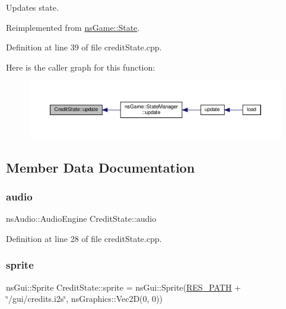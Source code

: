 Updates state. 



Reimplemented from \hyperlink{structns_game_1_1_state_ae809e89ac9df4a43ab90d5d5932e2bc7}{ns\+Game\+::\+State}.



Definition at line 39 of file credit\+State.\+cpp.

Here is the caller graph for this function\+:\nopagebreak
\begin{figure}[H]
\begin{center}
\leavevmode
\includegraphics[width=350pt]{class_credit_state_a52a92d650fce22fa08b37359c3a5aa64_icgraph}
\end{center}
\end{figure}


\subsection{Member Data Documentation}
\mbox{\label{class_credit_state_a8dd128ec1e8d3b8da0da5bd0be38c96d}} 
\subsubsection{\texorpdfstring{audio}{audio}}
{\footnotesize\ttfamily ns\+Audio\+::\+Audio\+Engine Credit\+State\+::audio}



Definition at line 28 of file credit\+State.\+cpp.

\mbox{\label{class_credit_state_a10ae436f8c1ca5d87cc960ada3cadb18}} 
\subsubsection{\texorpdfstring{sprite}{sprite}}
{\footnotesize\ttfamily ns\+Gui\+::\+Sprite Credit\+State\+::sprite = ns\+Gui\+::\+Sprite(\hyperlink{definitions_8h_a793644bd88146828177a2a4f57e3bf01}{R\+E\+S\+\_\+\+P\+A\+TH} + \char`\"{}/gui/credits.\+i2s\char`\"{}, ns\+Graphics\+::\+Vec2D(0, 0))}



